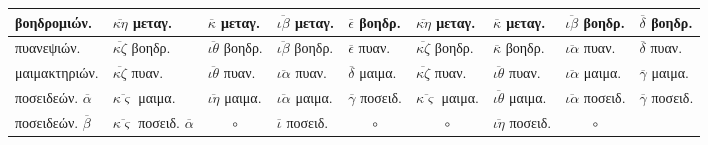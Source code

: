 \begin{tabular}{l llllllll}
\\
\textgreek{βοηδρομιών.} &
$\overline{\kappa\eta}$      \textgreek{μεταγ.} &
$\overline{\kappa}$          \textgreek{μεταγ.} &
$\overline{\iota\beta}$      \textgreek{μεταγ.} &
$\overline{\epsilon}$        \textgreek{βοηδρ.} &
$\overline{\kappa\eta}$      \textgreek{μεταγ.} &
$\overline{\kappa}$          \textgreek{μεταγ.} &
$\overline{\iota\beta}$      \textgreek{βοηδρ.} &
$\overline{\delta}$          \textgreek{βοηδρ.}
\\
\hline
\textgreek{πυανεψιών.} &
$\overline{\kappa\zeta}$     \textgreek{βοηδρ.} &
$\overline{\iota\theta}$     \textgreek{βοηδρ.} &
$\overline{\iota\beta}$      \textgreek{βοηδρ.} &
$\overline{\epsilon}$        \textgreek{πυαν.} &
$\overline{\kappa\zeta}$     \textgreek{βοηδρ.} &
$\overline{\kappa}$          \textgreek{βοηδρ.} &
$\overline{\iota\alpha}$     \textgreek{πυαν.} &
$\overline{\delta}$          \textgreek{πυαν.}
\\
\textgreek{μαιμακτηριών.} &
$\overline{\kappa\zeta}$     \textgreek{πυαν.} &
$\overline{\iota\theta}$     \textgreek{πυαν.} &
$\overline{\iota\alpha}$     \textgreek{πυαν.} &
$\overline{\delta}$          \textgreek{μαιμα.} &
$\overline{\kappa\zeta}$     \textgreek{πυαν.} &
$\overline{\iota\theta}$     \textgreek{πυαν.} &
$\overline{\iota\alpha}$     \textgreek{μαιμα.} &
$\overline{\gamma}$          \textgreek{μαιμα.}
\\
\textgreek{ποσειδεών.} $\overline{\alpha}$&
$\overline{\kappa\varsigma}$ \textgreek{μαιμα.} &
$\overline{\iota\eta}$       \textgreek{μαιμα.} &
$\overline{\iota\alpha}$     \textgreek{μαιμα.} &
$\overline{\gamma}$          \textgreek{ποσειδ.} &
$\overline{\kappa\varsigma}$ \textgreek{μαιμα.} &
$\overline{\iota\theta}$     \textgreek{μαιμα.} &
$\overline{\iota\alpha}$     \textgreek{ποσειδ.} &
$\overline{\gamma}$          \textgreek{ποσειδ.}
\\
\textgreek{ποσειδεών.} $\overline{\beta}$&
$\overline{\kappa\varsigma}$ \textgreek{ποσειδ.} $\overline{\alpha}$ &
    \multicolumn{1}{c}{$\circ$} &
$\overline{\iota}$           \textgreek{ποσειδ.} &
    \multicolumn{1}{c}{$\circ$} &
    \multicolumn{1}{c}{$\circ$} &
$\overline{\iota\eta}$       \textgreek{ποσειδ.} &
    \multicolumn{1}{c}{$\circ$} &
~
\\
\end{tabular}
%
%
